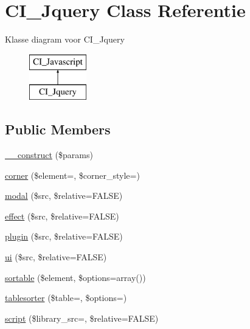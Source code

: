 \hypertarget{class_c_i___jquery}{}\section{C\+I\+\_\+\+Jquery Class Referentie}
\label{class_c_i___jquery}
Klasse diagram voor C\+I\+\_\+\+Jquery\begin{figure}[H]
\begin{center}
\leavevmode
\includegraphics[height=2.000000cm]{class_c_i___jquery}
\end{center}
\end{figure}
\subsection*{Public Members}
\begin{DoxyCompactItemize}
\item 
\mbox{\hyperlink{class_c_i___jquery_a9162320adff1a1a4afd7f2372f753a3e}{\+\_\+\+\_\+construct}} (\$params)
\item 
\mbox{\hyperlink{class_c_i___jquery_a79fc5ec6312aa89cd06e47c864e37ff1}{corner}} (\$element=\textquotesingle{}\textquotesingle{}, \$corner\+\_\+style=\textquotesingle{}\textquotesingle{})
\item 
\mbox{\hyperlink{class_c_i___jquery_a951696f5f5092fee0d2aba1f8602b419}{modal}} (\$src, \$relative=F\+A\+L\+SE)
\item 
\mbox{\hyperlink{class_c_i___jquery_a42898d255de9b25100e042825a1c4633}{effect}} (\$src, \$relative=F\+A\+L\+SE)
\item 
\mbox{\hyperlink{class_c_i___jquery_a25a0d7f0c18dac193aa2c67908c85c89}{plugin}} (\$src, \$relative=F\+A\+L\+SE)
\item 
\mbox{\hyperlink{class_c_i___jquery_ad2d6d964ed10597e0223f883c553cf0c}{ui}} (\$src, \$relative=F\+A\+L\+SE)
\item 
\mbox{\hyperlink{class_c_i___jquery_afb2aa7347e6ff89ab0177478a7f3869d}{sortable}} (\$element, \$options=array())
\item 
\mbox{\hyperlink{class_c_i___jquery_a088079669b8389ceb97efea5381caf62}{tablesorter}} (\$table=\textquotesingle{}\textquotesingle{}, \$options=\textquotesingle{}\textquotesingle{})
\item 
\mbox{\hyperlink{class_c_i___jquery_a4ebe6b0267c1a82bec52f1ffbc10ef8d}{script}} (\$library\+\_\+src=\textquotesingle{}\textquotesingle{}, \$relative=F\+A\+L\+SE)
\end{DoxyCompactItemize}
